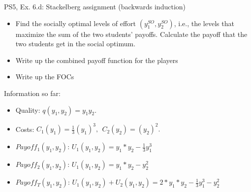 \begin{frame}{PS5, Ex. 6.d: Stackelberg assignment (backwards induction)}
  \begin{itemize}
    \item[(d)] Find the socially optimal levels of effort $(y_1^{SO}, y_2^{SO})$, i.e., the levels that maximize the sum of the two students’ payoffs. Calculate the payoff that the two students get in the social optimum.
  \end{itemize}
  \begin{multicols}{2}
    \begin{itemize}
      \item[(Step 1)] Write up the combined payoff function for the players
      \item[(Step 2)] Write up the FOCs
    \end{itemize}
    \vfill\null \columnbreak
    Information so far:\\\medskip
    \begin{itemize}
        \item[1] Quality: $q(y_1, y_2) = y_1y_2.$\\
        \item[2] Costs: $C_1(y_1) = \frac{1}{3}(y_1)^3,\ \ C_2(y_2) = (y_2)^2.$\\
        \item[3] $Payoff_1(y_1,y_2)$: $U_1(y_1,y_2) = y_1*y_2-\frac{1}{3}y_1^3$ \\
        \item[4] $Payoff_2(y_1,y_2)$: $U_1(y_1,y_2) = y_1*y_2-y_2^2$ \\
        \item[5] $Payoff_T(y_1,y_2)$: $U_1(y_1,y_2)+U_2(y_1,y_2) = 2*y_1*y_2-\frac{1}{3}y_1^3 - y_2^2$ \\
    \end{itemize}
  \end{multicols}
\end{frame}


